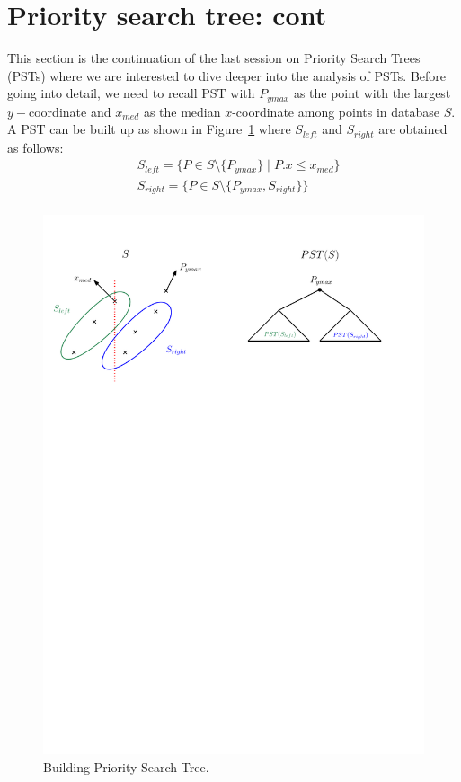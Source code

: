 \section{Priority search tree: cont}
\label{sec:range-queries}

This section is the continuation of the last session on Priority Search Trees (PSTs) where we are interested to dive deeper into the analysis of PSTs. Before going into detail, we need to recall PST with $P_{ymax}$ as the point with the largest $y-$coordinate and $x_{med}$ as the median $x$-coordinate among points in database $S$. A PST can be built up as shown in Figure~\ref{fig:PST1} where $S_{left}$ and $S_{right}$ are obtained as follows:
\begin{align*}
    & S_{left}=\{P \in S\setminus \{P_{ymax}\} \mid P.x \leq x_{med} \}\\
    &  S_{right}=\{P \in S\setminus \{P_{ymax}, S_{right}\}\}\\
\end{align*}
\begin{figure}[h!]
\begin{center}
  \includegraphics[scale = .5]{ipe/RQ1.pdf}
  \vspace{-0.1in}
  \caption{Building Priority Search Tree.}
  \label{fig:PST1}
\end{center}
\end{figure}

